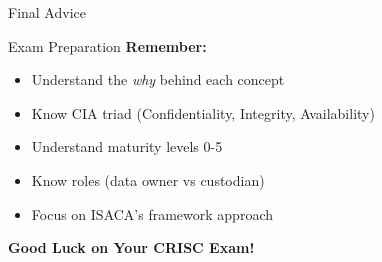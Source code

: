 \documentclass{beamer}
\begin{document}
	\begin{frame}{Final Advice}
		\begin{block}{Exam Preparation}
			\centering
			\vspace{0.5cm}
			\textbf{Remember:}
			\begin{itemize}
				\item Understand the \textit{why} behind each concept
				\item Know CIA triad (Confidentiality, Integrity, Availability)
				\item Understand maturity levels 0-5
				\item Know roles (data owner vs custodian)
				\item Focus on ISACA's framework approach
			\end{itemize}
			\vspace{1cm}
			\textbf{Good Luck on Your CRISC Exam!}
		\end{block}
	\end{frame}
	
\end{document}
